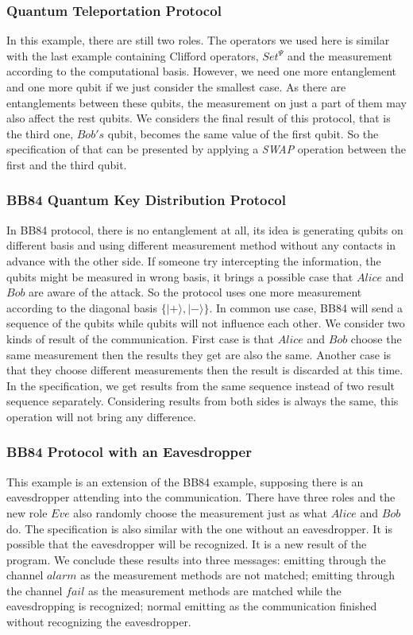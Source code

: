 \documentclass[runningheads]{llncs}
\begin{document}
\subsubsection{Quantum Teleportation Protocol} In this example, there are still two roles. The operators we used here is similar with the last example containing Clifford operators, $Set^{\Psi}$ and the measurement according to the computational basis. However, we need one more entanglement and one more qubit if we just consider the smallest case. As there are entanglements between these qubits, the measurement on just a part of them may also affect the rest qubits. We considers the final result of this protocol, that is the third one, $Bob's$ qubit, becomes the same value of the first qubit. So the specification of that can be presented by applying a \textit{SWAP} operation between the first and the third qubit.
\subsubsection{BB84 Quantum Key Distribution Protocol} In BB84 protocol, there is no entanglement at all, its idea is generating qubits on different basis and using different measurement method without any contacts in advance with the other side. If someone try intercepting the information, the qubits might be measured in wrong basis, it brings a possible case that $Alice$ and $Bob$ are aware of the attack. So the protocol uses one more measurement according to the diagonal basis $\{|+\rangle,|-\rangle\}$. In common use case, BB84 will send a sequence of the qubits while qubits will not influence each other. We consider two kinds of result of the communication. First case is that $Alice$ and $Bob$ choose the same measurement then the results they get are also the same. Another case is that they choose different measurements then the result is discarded at this time. In the specification, we get results from the same sequence instead of two result sequence separately. Considering results from both sides is always the same, this operation will not bring any difference.
\subsubsection{BB84 Protocol with an Eavesdropper} This example is an extension of the BB84 example, supposing there is an eavesdropper attending into the communication. There have three roles and the new role $Eve$ also randomly choose the measurement just as what $Alice$ and $Bob$ do. The specification is also similar with the one without an eavesdropper. It is possible that the eavesdropper will be recognized. It is a new result of the program. We conclude these results into three messages: emitting through the channel $alarm$ as the measurement methods are not matched; emitting through the channel $fail$ as the measurement methods are matched while the eavesdropping is recognized; normal emitting as the communication finished without recognizing the eavesdropper.
\end{document}
